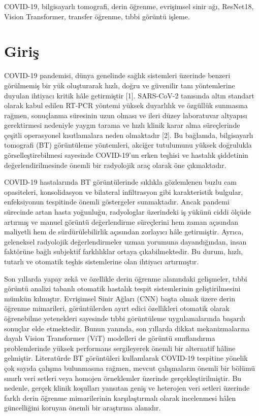 \documentclass[conference]{IEEEtran}
\begin{document}
\begin{IEEEkeywords}
COVID-19, bilgisayarlı tomografi, derin öğrenme, evrişimsel sinir ağı, ResNet18, Vision Transformer, transfer öğrenme, tıbbi görüntü işleme.
\end{IEEEkeywords}

\section{Giriş}
COVID-19 pandemisi, dünya genelinde sağlık sistemleri üzerinde benzeri görülmemiş bir yük oluşturarak hızlı, doğru ve güvenilir tanı yöntemlerine duyulan ihtiyacı kritik hâle getirmiştir [1]. SARS-CoV-2 tanısında altın standart olarak kabul edilen RT-PCR yöntemi yüksek duyarlılık ve özgüllük sunmasına rağmen, sonuçlanma süresinin uzun olması ve ileri düzey laboratuvar altyapısı gerektirmesi nedeniyle yaygın tarama ve hızlı klinik karar alma süreçlerinde çeşitli operasyonel kısıtlamalara neden olmaktadır [2]. Bu bağlamda, bilgisayarlı tomografi (BT) görüntüleme yöntemleri, akciğer tutulumunu yüksek doğrulukla görselleştirebilmesi sayesinde COVID-19'un erken teşhisi ve hastalık şiddetinin değerlendirilmesinde önemli bir radyolojik araç olarak öne çıkmaktadır.

COVID-19 hastalarında BT görüntülerinde sıklıkla gözlemlenen buzlu cam opasiteleri, konsolidasyon ve bilateral infiltrasyon gibi karakteristik bulgular, enfeksiyonun tespitinde önemli göstergeler sunmaktadır. Ancak pandemi sürecinde artan hasta yoğunluğu, radyologlar üzerindeki iş yükünü ciddi ölçüde artırmış ve manuel görüntü değerlendirme süreçlerini hem zaman açısından maliyetli hem de sürdürülebilirlik açısından zorlayıcı hâle getirmiştir. Ayrıca, geleneksel radyolojik değerlendirmeler uzman yorumuna dayandığından, insan faktörüne bağlı subjektif farklılıklar ortaya çıkabilmektedir. Bu durum, hızlı, tutarlı ve otomatik teşhis sistemlerine olan ihtiyacı artırmıştır.

Son yıllarda yapay zekâ ve özellikle derin öğrenme alanındaki gelişmeler, tıbbi görüntü analizi tabanlı otomatik hastalık tespit sistemlerinin geliştirilmesini mümkün kılmıştır. Evrişimsel Sinir Ağları (CNN) başta olmak üzere derin öğrenme mimarileri, görüntülerden ayırt edici özellikleri otomatik olarak öğrenebilme yetenekleri sayesinde tıbbi görüntüleme uygulamalarında başarılı sonuçlar elde etmektedir. Bunun yanında, son yıllarda dikkat mekanizmalarına dayalı Vision Transformer (ViT) modelleri de görüntü sınıflandırma problemlerinde yüksek performans sergileyerek önemli bir alternatif hâline gelmiştir. Literatürde BT görüntüleri kullanılarak COVID-19 tespitine yönelik çok sayıda çalışma bulunmasına rağmen, mevcut çalışmaların önemli bir bölümü sınırlı veri setleri veya homojen örneklemler üzerinde gerçekleştirilmiştir. Bu nedenle, gerçek klinik koşulları yansıtan geniş ve heterojen veri setleri üzerinde farklı derin öğrenme mimarilerinin karşılaştırmalı olarak incelenmesi hâlen güncelliğini koruyan önemli bir araştırma alanıdır.
\end{document}
